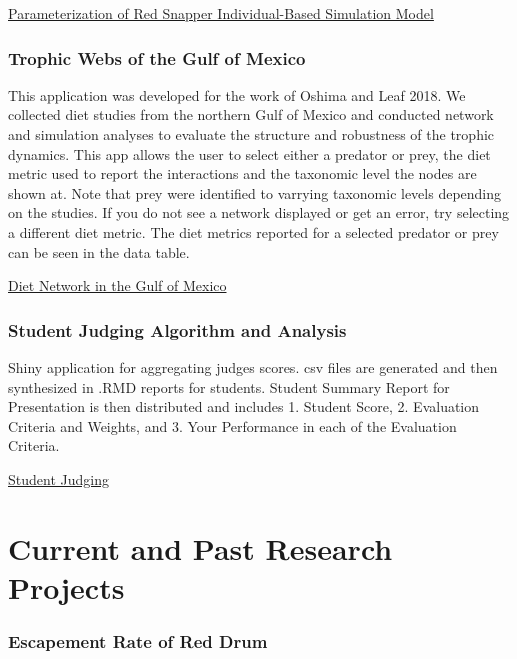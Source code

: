 \documentclass[]{article}
\begin{document}
\href{https://robe.shinyapps.io/SurveyRedSnapper02/}{Parameterization of
Red Snapper Individual-Based Simulation Model}

\hypertarget{trophic-webs-of-the-gulf-of-mexico}{%
\subsubsection{Trophic Webs of the Gulf of
Mexico}\label{trophic-webs-of-the-gulf-of-mexico}}

This application was developed for the work of Oshima and Leaf 2018. We
collected diet studies from the northern Gulf of Mexico and conducted
network and simulation analyses to evaluate the structure and robustness
of the trophic dynamics. This app allows the user to select either a
predator or prey, the diet metric used to report the interactions and
the taxonomic level the nodes are shown at. Note that prey were
identified to varrying taxonomic levels depending on the studies. If you
do not see a network displayed or get an error, try selecting a
different diet metric. The diet metrics reported for a selected predator
or prey can be seen in the data table.

\href{https://megumi-oshima.shinyapps.io/diet/}{Diet Network in the Gulf
of Mexico}

\hypertarget{student-judging-algorithm-and-analysis}{%
\subsubsection{Student Judging Algorithm and
Analysis}\label{student-judging-algorithm-and-analysis}}

Shiny application for aggregating judges scores. csv files are generated
and then synthesized in .RMD reports for students. Student Summary
Report for Presentation is then distributed and includes 1. Student
Score, 2. Evaluation Criteria and Weights, and 3. Your Performance in
each of the Evaluation Criteria.

\href{https://robe.shinyapps.io/judge/}{Student Judging}

\hypertarget{current-and-past-research-projects}{%
\section{Current and Past Research
Projects}\label{current-and-past-research-projects}}

\hypertarget{escapement-rate-of-red-drum}{%
\subsubsection{Escapement Rate of Red
Drum}\label{escapement-rate-of-red-drum}}
\end{document}
